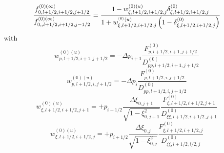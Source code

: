 \begin{equation}
\frac{f_{0,l+1/2,i+1/2,j+1/2}^{\left( 0\right) (\infty )}}{%
f_{0,,l+1/2,i+1/2,j-1/2}^{\left( 0\right) (\infty )}}=\frac{1-w_{\xi
,l+1/2,i+1/2,j}^{\left( 0\right) (u)}\delta _{\xi ,l+1/2,i+1/2,j}^{\left(
0\right) }}{1+w_{\xi ,l+1/2,i+1/2,j}^{^{\left( 0\right) }(u)}\left( 1-\delta
_{\xi ,l+1/2,i+1/2,j}^{\left( 0\right) }\right) }
\end{equation}
with
\begin{equation}
w_{p,l+1/2,i+1,j+1/2}^{\left( 0\right) (u)}=-\Delta p_{i+1}\frac{
F_{p,l+1/2,i+1,j+1/2}^{\left( 0\right) }}{D_{pp,l+1/2,i+1,j+1/2}^{\left(
0\right) }}
\end{equation}
\begin{equation}
w_{p,l+1/2,i,j+1/2}^{\left( 0\right) (u)}=-\Delta p_{i}\frac{
F_{p,l+1/2,i,j+1/2}^{\left( 0\right) }}{D_{pp,l+1/2,i,j+1/2}^{\left(
0\right) }}
\end{equation}
\begin{equation}
w_{\xi ,l+1/2,i+1/2,j+1}^{\left( 0\right) (u)}=+p_{i+1/2}\frac{\Delta \xi
_{0,j+1}}{\sqrt{1-\xi _{0,j+1}^{2}}}\frac{F_{\xi ,l+1/2,i+1/2,j+1}^{\left(
0\right) }}{D_{\xi \xi ,l+1/2,i+1/2,j+1}^{\left( 0\right) }}
\end{equation}
\begin{equation}
w_{\xi ,l+1/2,i+1/2,j}^{\left( 0\right) (u)}=+p_{i+1/2}\frac{\Delta \xi
_{0,j}}{\sqrt{1-\xi _{0,j}^{2}}}\frac{F_{\xi ,l+1/2,i+1/2,j}^{\left(
0\right) }}{D_{\xi \xi ,l+1/2,i/2,j}^{\left( 0\right) }}
\end{equation}

